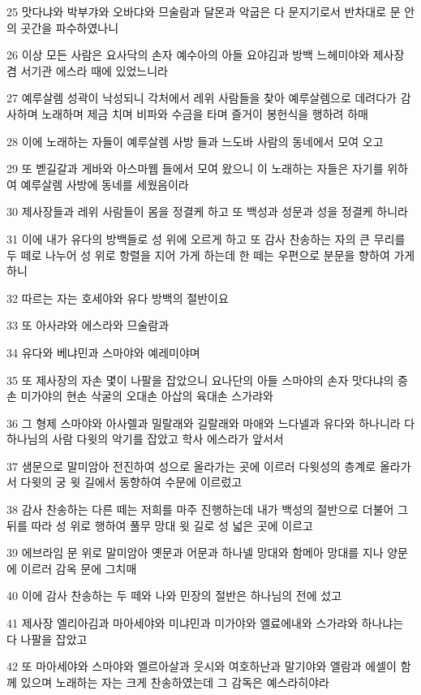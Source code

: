 \par 25 맛다냐와 박부갸와 오바댜와 므술람과 달몬과 악굽은 다 문지기로서 반차대로 문 안의 곳간을 파수하였나니
\par 26 이상 모든 사람은 요사닥의 손자 예수아의 아들 요야김과 방백 느헤미야와 제사장 겸 서기관 에스라 때에 있었느니라
\par 27 예루살렘 성곽이 낙성되니 각처에서 레위 사람들을 찾아 예루살렘으로 데려다가 감사하며 노래하며 제금 치며 비파와 수금을 타며 즐거이 봉헌식을 행하려 하매
\par 28 이에 노래하는 자들이 예루살렘 사방 들과 느도바 사람의 동네에서 모여 오고
\par 29 또 벧길갈과 게바와 아스마웹 들에서 모여 왔으니 이 노래하는 자들은 자기를 위하여 예루살렘 사방에 동네를 세웠음이라
\par 30 제사장들과 레위 사람들이 몸을 정결케 하고 또 백성과 성문과 성을 정결케 하니라
\par 31 이에 내가 유다의 방백들로 성 위에 오르게 하고 또 감사 찬송하는 자의 큰 무리를 두 떼로 나누어 성 위로 항렬을 지어 가게 하는데 한 떼는 우편으로 분문을 향하여 가게하니
\par 32 따르는 자는 호세야와 유다 방백의 절반이요
\par 33 또 아사랴와 에스라와 므술람과
\par 34 유다와 베냐민과 스마야와 예레미야며
\par 35 또 제사장의 자손 몇이 나팔을 잡았으니 요나단의 아들 스마야의 손자 맛다냐의 증손 미가야의 현손 삭굴의 오대손 아삽의 육대손 스가랴와
\par 36 그 형제 스마야와 아사렐과 밀랄래와 길랄래와 마애와 느다넬과 유다와 하나니라 다 하나님의 사람 다윗의 악기를 잡았고 학사 에스라가 앞서서
\par 37 샘문으로 말미암아 전진하여 성으로 올라가는 곳에 이르러 다윗성의 층계로 올라가서 다윗의 궁 윗 길에서 동향하여 수문에 이르렀고
\par 38 감사 찬송하는 다른 떼는 저희를 마주 진행하는데 내가 백성의 절반으로 더불어 그 뒤를 따라 성 위로 행하여 풀무 망대 윗 길로 성 넓은 곳에 이르고
\par 39 에브라임 문 위로 말미암아 옛문과 어문과 하나넬 망대와 함메아 망대를 지나 양문에 이르러 감옥 문에 그치매
\par 40 이에 감사 찬송하는 두 떼와 나와 민장의 절반은 하나님의 전에 섰고
\par 41 제사장 엘리아김과 마아세야와 미냐민과 미가야와 엘료에내와 스가랴와 하나냐는 다 나팔을 잡았고
\par 42 또 마아세야와 스마야와 엘르아살과 웃시와 여호하난과 말기야와 엘람과 에셀이 함께 있으며 노래하는 자는 크게 찬송하였는데 그 감독은 예스라히야라
